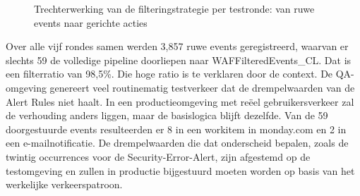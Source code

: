 \begin{figure}[H]
    \centering
    \caption{Trechterwerking van de filteringstrategie per testronde: van ruwe events naar gerichte acties}
    \label{fig:filterratio}
\end{figure}

Over alle vijf rondes samen werden 3,857 ruwe events geregistreerd, waarvan er slechts 59 de volledige pipeline doorliepen naar WAFFilteredEvents\_CL. Dat is een filterratio van 98,5\%. Die hoge ratio is te verklaren door de context. De QA-omgeving genereert veel routinematig testverkeer dat de drempelwaarden van de Alert Rules niet haalt. In een productieomgeving met reëel gebruikersverkeer zal de verhouding anders liggen, maar de basislogica blijft dezelfde. Van de 59 doorgestuurde events resulteerden er 8 in een workitem in monday.com en 2 in een e-mailnotificatie. De drempelwaarden die dat onderscheid bepalen, zoals de twintig occurrences voor de Security-Error-Alert, zijn afgestemd op de testomgeving en zullen in productie bijgestuurd moeten worden op basis van het werkelijke verkeerspatroon.

